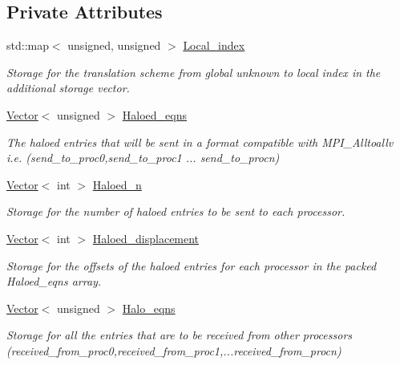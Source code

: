 \subsection*{Private Attributes}
\begin{DoxyCompactItemize}
\item 
std\+::map$<$ unsigned, unsigned $>$ \hyperlink{classoomph_1_1DoubleVectorHaloScheme_aa7dd736a03c4a605e7e4c0e9499154d4}{Local\+\_\+index}
\begin{DoxyCompactList}\small\item\em Storage for the translation scheme from global unknown to local index in the additional storage vector. \end{DoxyCompactList}\item 
\hyperlink{classoomph_1_1Vector}{Vector}$<$ unsigned $>$ \hyperlink{classoomph_1_1DoubleVectorHaloScheme_aac79c7fe19ec6fae41e2528a540d0eae}{Haloed\+\_\+eqns}
\begin{DoxyCompactList}\small\item\em The haloed entries that will be sent in a format compatible with M\+P\+I\+\_\+\+Alltoallv i.\+e. (send\+\_\+to\+\_\+proc0,send\+\_\+to\+\_\+proc1 ... send\+\_\+to\+\_\+procn) \end{DoxyCompactList}\item 
\hyperlink{classoomph_1_1Vector}{Vector}$<$ int $>$ \hyperlink{classoomph_1_1DoubleVectorHaloScheme_a13f0645d32135d7ffaedef8c888f7382}{Haloed\+\_\+n}
\begin{DoxyCompactList}\small\item\em Storage for the number of haloed entries to be sent to each processor. \end{DoxyCompactList}\item 
\hyperlink{classoomph_1_1Vector}{Vector}$<$ int $>$ \hyperlink{classoomph_1_1DoubleVectorHaloScheme_a7e8278718224d7348051443805bf145e}{Haloed\+\_\+displacement}
\begin{DoxyCompactList}\small\item\em Storage for the offsets of the haloed entries for each processor in the packed Haloed\+\_\+eqns array. \end{DoxyCompactList}\item 
\hyperlink{classoomph_1_1Vector}{Vector}$<$ unsigned $>$ \hyperlink{classoomph_1_1DoubleVectorHaloScheme_ae9dc75c67359f762bd09bdaf904158fe}{Halo\+\_\+eqns}
\begin{DoxyCompactList}\small\item\em Storage for all the entries that are to be received from other processors (received\+\_\+from\+\_\+proc0,received\+\_\+from\+\_\+proc1,...received\+\_\+from\+\_\+procn) \end{DoxyCompactList}\item 

\end{DoxyCompactItemize}
